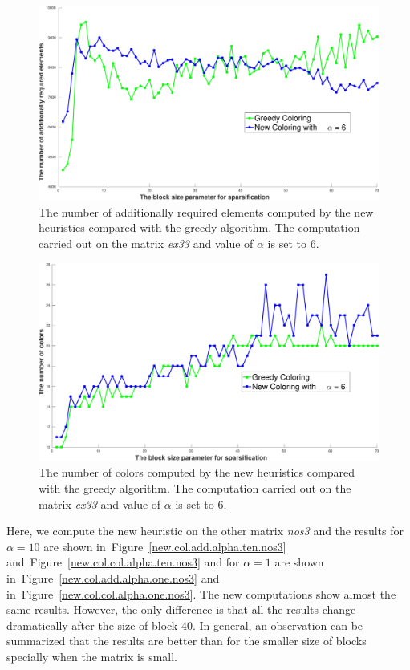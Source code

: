 \documentclass[12pt, twoside,a4paper,toc=bibliography]{scrbook}
\newcommand{\figref}[1]{Figure~\protect\ref{#1}}
\begin{document}
\begin{figure}
\centering
\includegraphics[width=0.9\linewidth]{bls_add_alpha_6}
\caption{The number of additionally required elements computed by the new heuristics compared with the
greedy algorithm. The computation carried out on the matrix \textit{ex33} and value of $\alpha$ is
set to $6$.}
\label{new.col.add.alpha.six}
\end{figure}
\begin{figure}
\centering
\includegraphics[width=0.9\linewidth]{bls_col_alpha_6}
\caption{The number of colors computed by the new heuristics compared with the
greedy algorithm. The computation carried out on the matrix \textit{ex33} and value of $\alpha$ is
set to $6$.}
\label{new.col.col.alpha.six}
\end{figure}

Here, we compute the new heuristic on the other matrix \textit{nos3}
and the results for $\alpha=10$ are shown in~\figref{new.col.add.alpha.ten.nos3}
and~\figref{new.col.col.alpha.ten.nos3}
and for $\alpha=1$ are shown in~\figref{new.col.add.alpha.one.nos3} and
in~\figref{new.col.col.alpha.one.nos3}.
The new computations show almost the same results. However,
the only difference is that all the results change dramatically
after the size of block $40$. In general, an observation can be
summarized that the results are better than for the smaller size of blocks
specially when the matrix is small.
\end{document}
